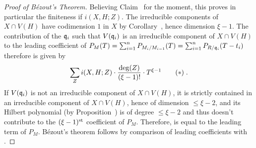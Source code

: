 \documentclass[a4paper,parskip=half,numbers=enddot, DIV=12]{scrreprt}
\begin{document}
\begin{proof}[Proof of B\'ezout's Theorem]
     Believing Claim~ for the moment, this proves in particular the finiteness if $i(X,H;Z)$. The irreducible components of $X\cap V(H)$ have codimension $1$ in $X$ by Corollary~, hence dimension $\xi-1$. The contribution of the $\mathfrak{q}_i$ such that $V(\mathfrak{q}_i)$ is an irreducible component of $X\cap V(H)$ to the leading coefficient of $P_M (T) = \sum_{i=1}^n P_{M_i/M_{i-1}}(T) = \sum_{i=1}^n P_{R/\mathfrak{q}_i}(T-t_i)$ therefore is given by
    \begin{align*}
        \sum_{Z} i(X,H;Z) \cdot \frac{\deg(Z)}{(\xi-1)!}\cdot T^{\xi-1}\tag{$*$} \lbl{eq:bezoutLeadingCoeff}\;.
    \end{align*}
    If $V(\mathfrak{q}_i)$ is not an irreducible component of $X\cap V(H)$, it is strictly contained in an irreducible component of $X\cap V(H)$, hence of dimension $\leq\xi-2$, and its Hilbert polynomial (by Proposition~) is of degree $\leq\xi-2$ and thus doesn't contribute to the $(\xi-1)^{\text{st}}$ coefficient of $P_M$. Therefore,  is equal to the leading term of $P_M$. B\'ezout's theorem follows by comparison of leading coefficients with .
    

\end{proof}
\end{document}

